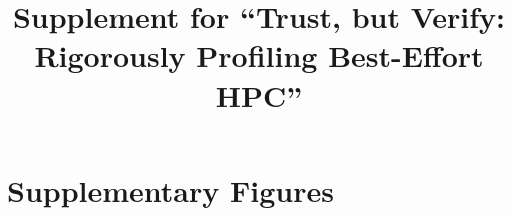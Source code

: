 \documentclass[a4paper, 11pt]{article}
\title{Supplement for ``Trust, but Verify: Rigorously Profiling Best-Effort HPC''}
\begin{document}
  \maketitle %

  \onehalfspacing %

  
  
  
  
  
  
  
  
  

  \clearpage
  \section{Supplementary Figures}
  

  \clearpage
{\small


}
\end{document}
